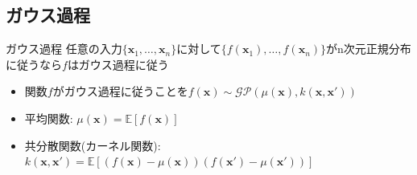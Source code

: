 \documentclass[dvipdfmx, 10.5pt]{beamer}
\begin{document}

\subsection{ガウス過程}
\begin{frame}{\insertsubsection}
	\begin{block}{ガウス過程}
		任意の入力$\{ \bm x_1, \ldots, \bm x_n \}$に対して$\{f(\bm x_1), \ldots, f(\bm x_n)\}$がn次元正規分布に従うなら$f$はガウス過程に従う
	\end{block}

\begin{itemize}
	\item 関数$f$がガウス過程に従うことを$f(\bm x) \sim \mathcal{GP}(\mu(\bm x), k(\bm x, \bm x'))$
	\item 平均関数: $\mu(\bm x) = \mathbb{E}[f(\bm x)]$
	\item 共分散関数(カーネル関数): $k(\bm x, \bm x') = \mathbb{E}[(f(\bm x) - \mu(\bm x))(f(\bm x') - \mu(\bm x'))]$
\end{itemize}
\end{frame}

\end{document}
